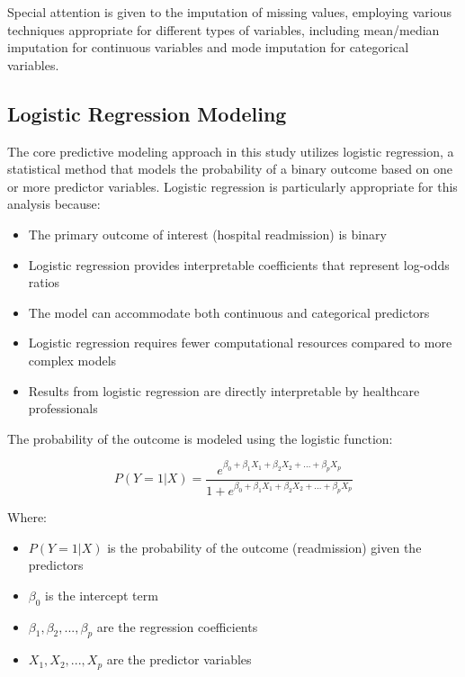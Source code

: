 Special attention is given to the imputation of missing values, employing various techniques appropriate for different types of variables, including mean/median imputation for continuous variables and mode imputation for categorical variables.

\subsection{Logistic Regression Modeling}
\label{sec:logistic}

The core predictive modeling approach in this study utilizes logistic regression, a statistical method that models the probability of a binary outcome based on one or more predictor variables. Logistic regression is particularly appropriate for this analysis because:

\begin{itemize}
    \item The primary outcome of interest (hospital readmission) is binary
    \item Logistic regression provides interpretable coefficients that represent log-odds ratios
    \item The model can accommodate both continuous and categorical predictors
    \item Logistic regression requires fewer computational resources compared to more complex models
    \item Results from logistic regression are directly interpretable by healthcare professionals
\end{itemize}

The probability of the outcome is modeled using the logistic function:

\begin{equation}
P(Y=1|X) = \frac{e^{\beta_0 + \beta_1 X_1 + \beta_2 X_2 + ... + \beta_p X_p}}{1 + e^{\beta_0 + \beta_1 X_1 + \beta_2 X_2 + ... + \beta_p X_p}}
\end{equation}

Where:
\begin{itemize}
    \item $P(Y=1|X)$ is the probability of the outcome (readmission) given the predictors
    \item $\beta_0$ is the intercept term
    \item $\beta_1, \beta_2, ..., \beta_p$ are the regression coefficients
    \item $X_1, X_2, ..., X_p$ are the predictor variables
\end{itemize}

